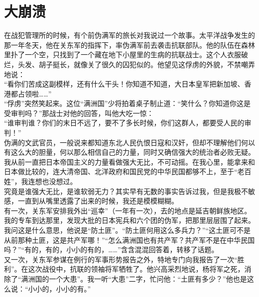 \fancyhead[RO]{\thepage} %
\fancyhead[LE]{\thepage} %
\chapter*{大崩溃}
在战犯管理所的时候，有个前伪满军的旅长对我说过一个故事。太平洋战争发生的那一年冬天，他在关东军的指挥下，率伪满军前去袭击抗联部队。他的队伍在森林里扑了一个空，只找到了一个藏在地下小屋里的生病的抗联战士。这个人衣服破烂，头发、胡子挺长，就像关了很久的囚犯似的。他望见这俘虏的外貌，不禁嘲弄地说：\\

“看你们苦成这副模样，还有什么干头！你知道不知道，大日本皇军把新加坡、香港都占领啦……”\\

“俘虏”突然笑起来。这位“满洲国”少将拍着桌子制止道：“笑什么？你知道你这是受审判吗？”那战士对他的回答，叫他大吃一惊：\\

“谁审判谁？你们的末日不远了，要不了多长时候，你们这群人，都要受人民的审判！”\\

伪满的文武官员，一般说来都知道东北人民仇恨日寇和汉奸，但却不理解他们何以有这么大的胆量，何以那么相信自己的力量，同时又确信强大的统治者必败无疑。我从前一直把日本帝国主义的力量看做强大无比，不可动摇。在我心里，能拿来和日本做比较的，连大清帝国、北洋政府和国民党的中华民国都够不上，至于“老百姓”，我连想也没想过。\\

究竟是谁强大无比，是谁软弱无力？其实早有无数的事实告诉过我，但是我极不敏感，一直到从嘴里透露了出来的时候，我还是模模糊糊。\\

有一次，关东军安排我外出“巡幸”（一年有一次），去的地点是延吉朝鲜族地区。我的专车到达那里，发现大批的日本宪兵和六个团的伪军，把那里层层围了起来。我问这是什么意思，他说是“防土匪”。“防土匪何用这么多兵力？”“这土匪可不是从前那种土匪，这是共产军哪！”“怎么满洲国也有共产军？共产军不是在中华民国吗？”“有的，有的，小小的有的，……”含含混混回答着，转移了话题。\\

又一次，关东军参谋在例行的军事形势报告之外，特地专门向我报告了一次“胜利”。在这次战役中，抗联的领袖将军牺牲了。他兴高采烈地说，杨将军之死，消除了“满洲国的一个大患”。我一听“大患”二字，忙问他：“土匪有多少？”他也是这么说：“小小的，小小的有。”\\

